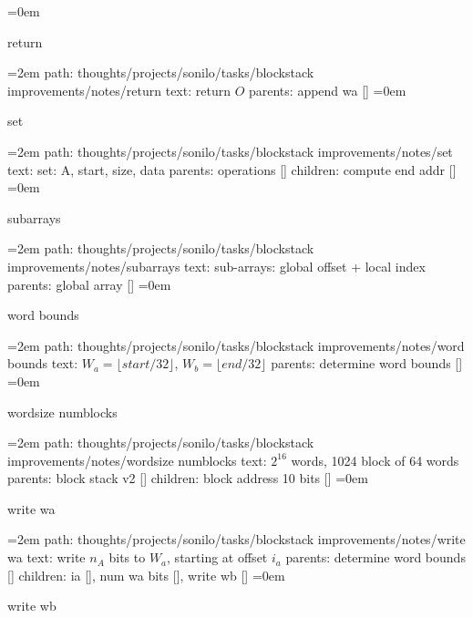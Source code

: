 \smallskip
\leftskip=0em
\par\endgroup
\bigskip
{}
return
\smallskip
\par\begingroup
\leftskip=2em
path: thoughts/projects/sonilo/tasks/blockstack improvements/notes/return
\smallskip
text:  return $O$
\smallskip
parents:  append wa []
\smallskip
\leftskip=0em
\par\endgroup
\bigskip
{}
set
\smallskip
\par\begingroup
\leftskip=2em
path: thoughts/projects/sonilo/tasks/blockstack improvements/notes/set
\smallskip
text:  set: A, start, size, data
\smallskip
parents:  operations []
\smallskip
children: compute end addr []
\smallskip
\leftskip=0em
\par\endgroup
\bigskip
{}
subarrays
\smallskip
\par\begingroup
\leftskip=2em
path: thoughts/projects/sonilo/tasks/blockstack improvements/notes/subarrays
\smallskip
text:  sub-arrays: global offset + local index
\smallskip
parents:  global array []
\smallskip
\leftskip=0em
\par\endgroup
\bigskip
{}
word bounds
\smallskip
\par\begingroup
\leftskip=2em
path: thoughts/projects/sonilo/tasks/blockstack improvements/notes/word bounds
\smallskip
text:  $W_a = \lfloor start / 32 \rfloor$, $W_b = \lfloor end / 32 \rfloor$
\smallskip
parents:  determine word bounds []
\smallskip
\leftskip=0em
\par\endgroup
\bigskip
{}
wordsize numblocks
\smallskip
\par\begingroup
\leftskip=2em
path: thoughts/projects/sonilo/tasks/blockstack improvements/notes/wordsize numblocks
\smallskip
text:  $2^{16}$ words, 1024 block of 64 words
\smallskip
parents:  block stack v2 []
\smallskip
children: block address 10 bits []
\smallskip
\leftskip=0em
\par\endgroup
\bigskip
{}
write wa
\smallskip
\par\begingroup
\leftskip=2em
path: thoughts/projects/sonilo/tasks/blockstack improvements/notes/write wa
\smallskip
text:  write $n_A$ bits to $W_a$, starting at offset $i_a$
\smallskip
parents:  determine word bounds []
\smallskip
children: ia [], num wa bits [], write wb []
\smallskip
\leftskip=0em
\par\endgroup
\bigskip
{}
write wb
\smallskip
\par\begingroup
